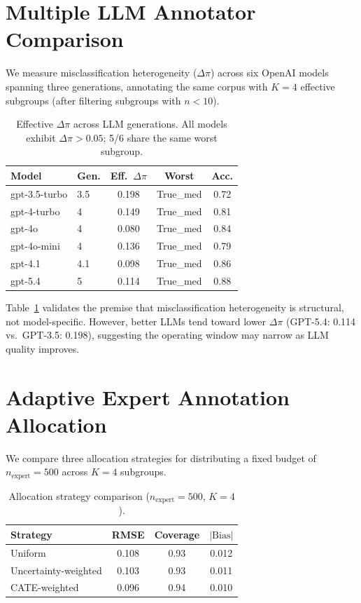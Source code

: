 \documentclass[11pt,twocolumn]{article}
\begin{document}
\appendix

\section{Multiple LLM Annotator Comparison}
\label{sec:multilm}

We measure misclassification heterogeneity ($\Delta\pi$) across six OpenAI models spanning three generations, annotating the same corpus with $K{=}4$ effective subgroups (after filtering subgroups with $n < 10$).

\begin{table}[h]
\centering
\small
\caption{Effective $\Delta\pi$ across LLM generations. All models exhibit $\Delta\pi > 0.05$; 5/6 share the same worst subgroup.}
\label{tab:multilm}
\begin{tabular}{@{}llccc@{}}
\toprule
Model & Gen. & Eff.\ $\Delta\pi$ & Worst & Acc. \\
\midrule
gpt-3.5-turbo & 3.5 & 0.198 & True\_med & 0.72 \\
gpt-4-turbo & 4 & 0.149 & True\_med & 0.81 \\
gpt-4o & 4 & 0.080 & True\_med & 0.84 \\
gpt-4o-mini & 4 & 0.136 & True\_med & 0.79 \\
gpt-4.1 & 4.1 & 0.098 & True\_med & 0.86 \\
gpt-5.4 & 5 & 0.114 & True\_med & 0.88 \\
\bottomrule
\end{tabular}
\end{table}

Table~\ref{tab:multilm} validates the premise that misclassification heterogeneity is structural, not model-specific. However, better LLMs tend toward lower $\Delta\pi$ (GPT-5.4: 0.114 vs.\ GPT-3.5: 0.198), suggesting the operating window may narrow as LLM quality improves.

\section{Adaptive Expert Annotation Allocation}

We compare three allocation strategies for distributing a fixed budget of $n_{\text{expert}}{=}500$ across $K{=}4$ subgroups.

\begin{table}[h]
\centering
\small
\caption{Allocation strategy comparison ($n_{\text{expert}}{=}500$, $K{=}4$).}
\label{tab:alloc}
\begin{tabular}{@{}lccc@{}}
\toprule
Strategy & RMSE & Coverage & $|\text{Bias}|$ \\
\midrule
Uniform & 0.108 & 0.93 & 0.012 \\
Uncertainty-weighted & 0.103 & 0.93 & 0.011 \\
CATE-weighted & 0.096 & 0.94 & 0.010 \\
\bottomrule
\end{tabular}
\end{table}
\end{document}
